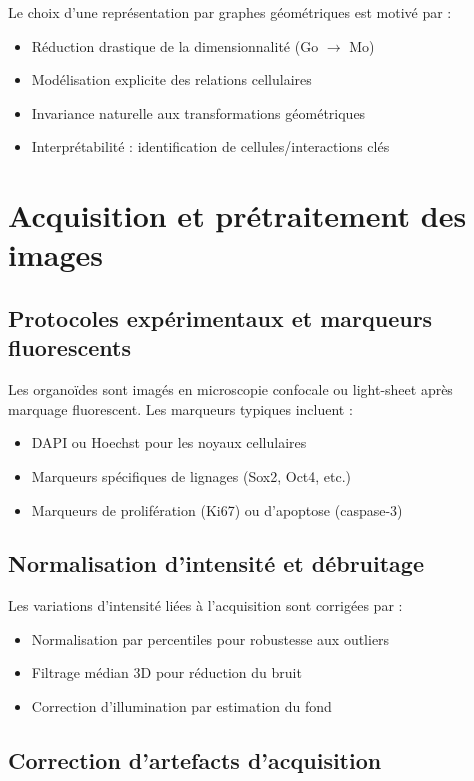 Le choix d'une représentation par graphes géométriques est motivé par :
\begin{itemize}
    \item Réduction drastique de la dimensionnalité (Go $\rightarrow$ Mo)
    \item Modélisation explicite des relations cellulaires
    \item Invariance naturelle aux transformations géométriques
    \item Interprétabilité : identification de cellules/interactions clés
\end{itemize}

\section{Acquisition et prétraitement des images}

\subsection{Protocoles expérimentaux et marqueurs fluorescents}

Les organoïdes sont imagés en microscopie confocale ou light-sheet après marquage fluorescent. Les marqueurs typiques incluent :
\begin{itemize}
    \item DAPI ou Hoechst pour les noyaux cellulaires
    \item Marqueurs spécifiques de lignages (Sox2, Oct4, etc.)
    \item Marqueurs de prolifération (Ki67) ou d'apoptose (caspase-3)
\end{itemize}

\subsection{Normalisation d'intensité et débruitage}

Les variations d'intensité liées à l'acquisition sont corrigées par :
\begin{itemize}
    \item Normalisation par percentiles pour robustesse aux outliers
    \item Filtrage médian 3D pour réduction du bruit
    \item Correction d'illumination par estimation du fond
\end{itemize}

\subsection{Correction d'artefacts d'acquisition}


